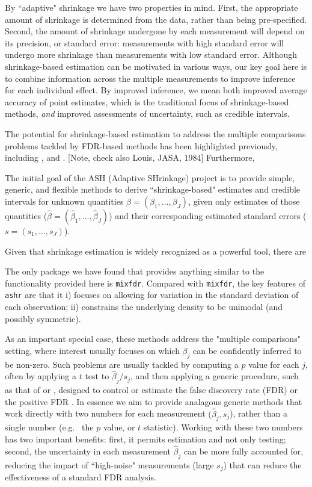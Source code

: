 \documentclass[11pt]{article}
\def\bhat{\hat{\beta}}
\def\mixfdr{{\tt mixfdr}\xspace}
\def\ashr{{\tt ashr}\xspace}
\begin{document}
By ``adaptive" shrinkage we 
have two properties in mind. First, the appropriate amount of shrinkage is determined from the data, rather than being pre-specified.
Second, the amount of shrinkage undergone by each measurement will depend on its precision, or standard error: measurements with high standard error will undergo more shrinkage than measurements with low standard error.  
Although shrinkage-based estimation can be motivated in various ways, our key goal here is to combine information across the multiple measurements to improve inference for each individual effect. By improved inference, we mean both
improved average accuracy of point estimates, which is
the traditional focus of shrinkage-based methods, \emph{and} improved assessments of uncertainty, such as credible intervals. 

The potential for shrinkage-based estimation to
address the multiple comparisons problems tackled by FDR-based methods
has been highlighted
previously, including \cite{greenland1991empirical},
\cite{efron2008microarrays} and \cite{gelman2012we}. [Note, check also Louis, JASA, 1984] 
Furthermore, 


The initial goal of the ASH (Adaptive SHrinkage) project is to provide simple, generic, and flexible methods to derive ``shrinkage-based" estimates and credible intervals for unknown quantities $\beta=(\beta_1,\dots,\beta_J)$, given only estimates of those quantities ($\bhat=(\bhat_1,\dots, \bhat_J)$) and their corresponding estimated standard errors ($s=(s_1,\dots,s_J)$). 





Given that shrinkage estimation is widely recognized as a powerful tool, there are 


The only package we have found that provides anything similar
to the functionality provided here is \mixfdr \cite{muralidharan2010empirical}. Compared with \mixfdr, the key features of \ashr are that it
i) focuses on allowing for variation in the standard deviation of each observation; ii) constrains the underlying density to be unimodal (and possibly symmetric).


As an important special case, these methods address the "multiple comparisons" setting, where interest usually focuses on which $\beta_j$ can be confidently inferred to be non-zero. Such problems are usually tackled by computing a $p$ value for each $j$, often by applying a $t$ test to $\bhat_j/s_j$,
and then applying a generic procedure, such as that of \cite{benjamini1995controlling} or \cite{storey2003statistical}, designed to control or
estimate the false discovery rate (FDR) or the positive FDR \cite{storey.03}. In essence we aim to provide analagous
generic methods that work directly with two numbers for each 
measurement $(\bhat_j,s_j$), rather than a single number (e.g.~ the $p$ value, or $t$ statistic). Working with these two numbers has two important benefits: first, it permits estimation and not only testing; second, the 
uncertainty in each measurement $\bhat_j$ can be more fully accounted for, reducing the impact of ``high-noise" measurements (large $s_j$) that can reduce the effectiveness of a standard FDR analysis. 
\end{document}
